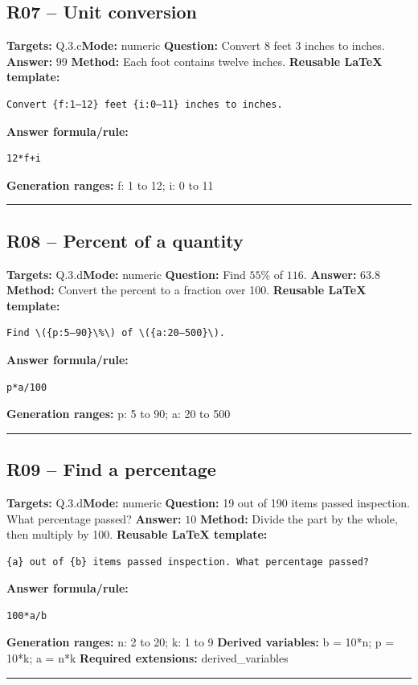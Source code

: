 \documentclass[11pt]{article}
\begin{document}
\subsection{R07 -- Unit conversion}
\textbf{Targets:} Q.3.c\quad\textbf{Mode:} numeric
\textbf{Question:} Convert 8 feet 3 inches to inches.
\textbf{Answer:} \(99\)
\textbf{Method:} Each foot contains twelve inches.
\textbf{Reusable LaTeX template:}
\begin{verbatim}
Convert {f:1–12} feet {i:0–11} inches to inches.
\end{verbatim}
\textbf{Answer formula/rule:}
\begin{verbatim}
12*f+i
\end{verbatim}
\textbf{Generation ranges:} f: 1 to 12; i: 0 to 11
\medskip\hrule\medskip
\subsection{R08 -- Percent of a quantity}
\textbf{Targets:} Q.3.d\quad\textbf{Mode:} numeric
\textbf{Question:} Find \(55\%\) of \(116\).
\textbf{Answer:} \(63.8\)
\textbf{Method:} Convert the percent to a fraction over 100.
\textbf{Reusable LaTeX template:}
\begin{verbatim}
Find \({p:5–90}\%\) of \({a:20–500}\).
\end{verbatim}
\textbf{Answer formula/rule:}
\begin{verbatim}
p*a/100
\end{verbatim}
\textbf{Generation ranges:} p: 5 to 90; a: 20 to 500
\medskip\hrule\medskip
\subsection{R09 -- Find a percentage}
\textbf{Targets:} Q.3.d\quad\textbf{Mode:} numeric
\textbf{Question:} 19 out of 190 items passed inspection. What percentage passed?
\textbf{Answer:} \(10\)
\textbf{Method:} Divide the part by the whole, then multiply by 100.
\textbf{Reusable LaTeX template:}
\begin{verbatim}
{a} out of {b} items passed inspection. What percentage passed?
\end{verbatim}
\textbf{Answer formula/rule:}
\begin{verbatim}
100*a/b
\end{verbatim}
\textbf{Generation ranges:} n: 2 to 20; k: 1 to 9
\textbf{Derived variables:} b = 10*n; p = 10*k; a = n*k
\textbf{Required extensions:} derived\_variables
\medskip\hrule\medskip
\end{document}
